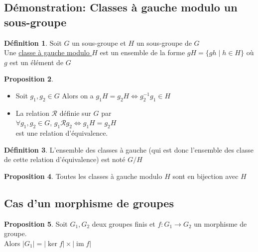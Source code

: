 \documentclass[10pt,a4paper]{article}
\theoremstyle{definition}
\newtheorem{proposition}{Proposition}[section]
\newtheorem{definition}[proposition]{Définition}
\DeclareMathOperator{\im}{im}
\begin{document}
\subsection{Démonstration: Classes à gauche modulo un sous-groupe}
\begin{definition}
Soit $G$ un sous-groupe et $H$ un sous-groupe de $G$ \\
Une \uline{classe à gauche modulo $H$} est un ensemble de la forme $g H = \{ g h \mid h \in H \}$ où $g$ est un élément de $G$
\end{definition}
\begin{proposition}
\hfill
\begin{itemize}
\item Soit $g_1, g_2 \in G$
Alors on a $g_1 H = g_2 H \iff g_2^{-1} g_1 \in H$
\item La relation $\mathcal{R}$ définie sur $G$ par \\
$\forall g_1, g_2 \in G$, $g_1 \mathcal{R} g_2 \iff g_1 H = g_2 H$ \\
est une relation d'équivalence.
\end{itemize}
\end{proposition}
\begin{definition}
L'ensemble des classes à gauche (qui est donc l'ensemble des classe de cette relation d'équivalence) est noté $G / H$
\end{definition}
\begin{proposition}
Toutes les classes à gauche modulo $H$ sont en bijection avec $H$
\end{proposition}

\subsection{Cas d'un morphisme de groupes}
\begin{proposition}
Soit $G_1, G_2$ deux groupes finis et $f: G_1 \to G_2$ un morphisme de groupe. \\
Alors $\left|G_1\right| = \left|\ker f\right| \times \left|\im f\right|$
\end{proposition}
\end{document}
